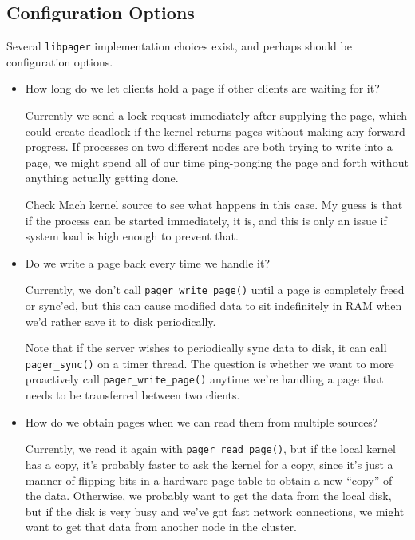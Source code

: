 \documentclass{article}
\def\libpager{{\tt libpager}\xspace}
\begin{document}
\subsection{Configuration Options}

Several \libpager implementation choices exist, and perhaps should be configuration options.

\begin{itemize}

\item How long do we let clients hold a page if other clients are waiting for it?

  Currently we send a lock request immediately after supplying the
  page, which could create deadlock if the kernel returns pages
  without making any forward progress.  If processes on two different
  nodes are both trying to write into a page, we might spend all of
  our time ping-ponging the page and forth without anything actually
  getting done.

  Check Mach kernel source to see what happens in this case.  My guess
  is that if the process can be started immediately, it is, and this
  is only an issue if system load is high enough to prevent that.

\item Do we write a page back every time we handle it?

  Currently, we don't call {\tt pager_write_page()} until a page is
  completely freed or sync'ed, but this can cause modified data to sit
  indefinitely in RAM when we'd rather save it to disk periodically.

  Note that if the server wishes to periodically sync data to disk, it
  can call {\tt pager_sync()} on a timer thread.  The question is
  whether we want to more proactively call {\tt pager_write_page()}
  anytime we're handling a page that needs to be transferred between
  two clients.

\item How do we obtain pages when we can read them from multiple sources?

  Currently, we read it again with {\tt pager_read_page()}, but if the
  local kernel has a copy, it's probably faster to ask the kernel for
  a copy, since it's just a manner of flipping bits in a hardware page
  table to obtain a new ``copy'' of the data.  Otherwise, we probably
  want to get the data from the local disk, but if the disk is very
  busy and we've got fast network connections, we might want to get
  that data from another node in the cluster.


\end{itemize}
\end{document}
